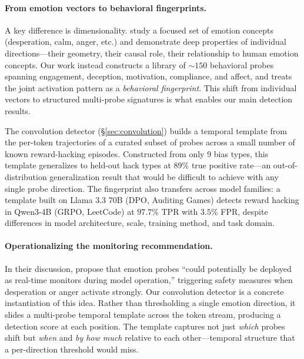 \paragraph{From emotion vectors to behavioral fingerprints.}
A key difference is dimensionality.
\citet{sofroniew2026emotion} study a focused set of emotion concepts (desperation, calm, anger, etc.) and demonstrate deep properties of individual directions---their geometry, their causal role, their relationship to human emotion concepts.
Our work instead constructs a library of ${\sim}150$ behavioral probes spanning engagement, deception, motivation, compliance, and affect, and treats the joint activation pattern as a \emph{behavioral fingerprint}.
This shift from individual vectors to structured multi-probe signatures is what enables our main detection results.

The convolution detector (\S\ref{sec:convolution}) builds a temporal template from the per-token trajectories of a curated subset of probes across a small number of known reward-hacking episodes.
Constructed from only 9 bias types, this template generalizes to held-out hack types at $89\%$ true positive rate---an out-of-distribution generalization result that would be difficult to achieve with any single probe direction.
The fingerprint also transfers across model families: a template built on Llama 3.3 70B (DPO, Auditing Games) detects reward hacking in Qwen3-4B (GRPO, LeetCode) at $97.7\%$ TPR with $3.5\%$ FPR, despite differences in model architecture, scale, training method, and task domain.

\paragraph{Operationalizing the monitoring recommendation.}
In their discussion, \citet{sofroniew2026emotion} propose that emotion probes ``could potentially be deployed as real-time monitors during model operation,'' triggering safety measures when desperation or anger activate strongly.
Our convolution detector is a concrete instantiation of this idea.
Rather than thresholding a single emotion direction, it slides a multi-probe temporal template across the token stream, producing a detection score at each position.
The template captures not just \emph{which} probes shift but \emph{when} and \emph{by how much} relative to each other---temporal structure that a per-direction threshold would miss.

